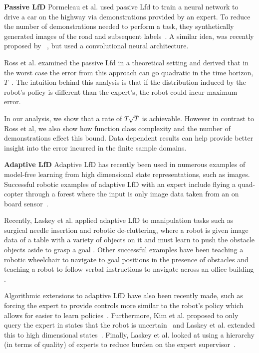 \documentclass[10pt, conference]{ieeeconf}      %
\begin{document}
\noindent \textbf {Passive LfD}
Pormeleau et al. used passive Lfd to train a neural network to drive a car on the highway via demonstrations provided by an expert. To reduce the number of demonstrations needed to perform a task, they synthetically generated  images of the road and subsequent labels~\cite{pomerleau1989alvinn}. A similar idea, was recently proposed by ~\cite{NVIDEA}, but used a convolutional neural architecture. 

Ross et al. examined the passive Lfd in a theoretical setting and derived that in the worst case the error from this approach can go quadratic in the time  horizon, $T$~\cite{ross2010efficient}. The intuition behind this analysis is that if the distribution induced by the robot's policy is different than the expert's, the robot could incur maximum error. 

In our analysis, we show that a rate of $T\sqrt{T}$ is achievable. However in contrast to Ross et al,  we also show how function class complexity and the number of demonstrations effect this bound. Data dependent results can help provide better insight into the error incurred in the finite sample domains. 

\noindent \textbf{Adaptive LfD}
Adaptive LfD has recently been used in numerous examples of model-free learning from high dimensional state representations, such as images. Successful robotic examples of adaptive LfD with an expert  include flying a quad-copter through a forest where the input is only image data taken from an on board sensor~\cite{ross2013learning}.

 Recently, Laskey et al. applied adaptive LfD to manipulation tasks such as surgical needle insertion \cite{laskeyshiv} and robotic de-cluttering, where a robot is given image data of a table with a variety of objects on it and must learn to push the obstacle objects aside to grasp a goal \cite{laskeyrobot}. Other successful examples have been teaching a robotic wheelchair to navigate to goal positions in the presence of obstacles and teaching a robot to follow verbal instructions to navigate across an office building \cite{kim2013maximum, duvallet2013imitation}. 

Algorithmic extensions to adaptive LfD have also been recently made, such as  forcing the expert to provide controls more similar to the robot's policy which allows for easier to learn policies~\cite{he2012imitation}. Furthermore, Kim et al. proposed to only query the expert in states that the robot is uncertain~\cite{kim2013maximum} and Laskey et al. extended this to high dimensional states~\cite{laskeyshiv}. Finally, Laskey et al. looked at using a hierarchy (in terms of quality) of experts to reduce burden on the expert supervisor~\cite{laskeyrobot}.
\end{document}
